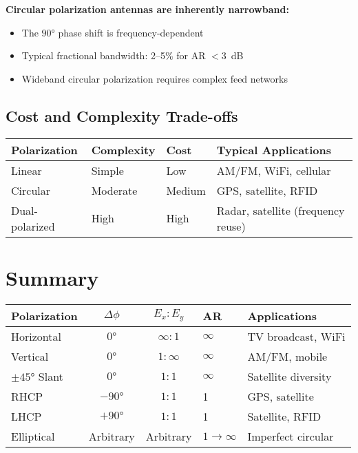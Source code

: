 \textbf{Circular polarization antennas are inherently narrowband:}
\begin{itemize}
\item The $90°$ phase shift is frequency-dependent
\item Typical fractional bandwidth: 2--5\% for AR $< 3$~dB
\item Wideband circular polarization requires complex feed networks
\end{itemize}

\subsection{Cost and Complexity Trade-offs}

\begin{center}
\begin{tabular}{@{}llll@{}}
\toprule
\textbf{Polarization} & \textbf{Complexity} & \textbf{Cost} & \textbf{Typical Applications} \\
\midrule
Linear & Simple & Low & AM/FM, WiFi, cellular \\
Circular & Moderate & Medium & GPS, satellite, RFID \\
Dual-polarized & High & High & Radar, satellite (frequency reuse) \\
\bottomrule
\end{tabular}
\end{center}

\section{Summary}

\begin{center}
\begin{tabular}{@{}lccll@{}}
\toprule
\textbf{Polarization} & \textbf{$\Delta\phi$} & \textbf{$E_x : E_y$} & \textbf{AR} & \textbf{Applications} \\
\midrule
Horizontal & $0°$ & $\infty : 1$ & $\infty$ & TV broadcast, WiFi \\
Vertical & $0°$ & $1 : \infty$ & $\infty$ & AM/FM, mobile \\
$\pm 45°$ Slant & $0°$ & $1 : 1$ & $\infty$ & Satellite diversity \\
RHCP & $-90°$ & $1 : 1$ & 1 & GPS, satellite \\
LHCP & $+90°$ & $1 : 1$ & 1 & Satellite, RFID \\
Elliptical & Arbitrary & Arbitrary & $1 \to \infty$ & Imperfect circular \\
\bottomrule
\end{tabular}
\end{center}

